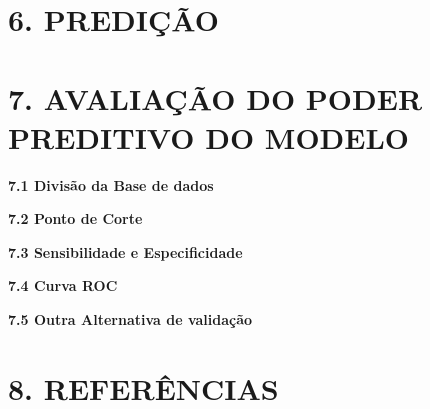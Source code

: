\documentclass[]{article}
\begin{document}
\hypertarget{predicao}{%
\section{6. PREDIÇÃO}\label{predicao}}

\hypertarget{avaliacao-do-poder-preditivo-do-modelo}{%
\section{7. AVALIAÇÃO DO PODER PREDITIVO DO
MODELO}\label{avaliacao-do-poder-preditivo-do-modelo}}

\textbf{7.1 Divisão da Base de dados}

\textbf{7.2 Ponto de Corte}

\textbf{7.3 Sensibilidade e Especificidade}

\textbf{7.4 Curva ROC}

\textbf{7.5 Outra Alternativa de validação}

\hypertarget{referencias}{%
\section{8. REFERÊNCIAS}\label{referencias}}

\hypertarget{section}{%
\section{}\label{section}}
\end{document}

